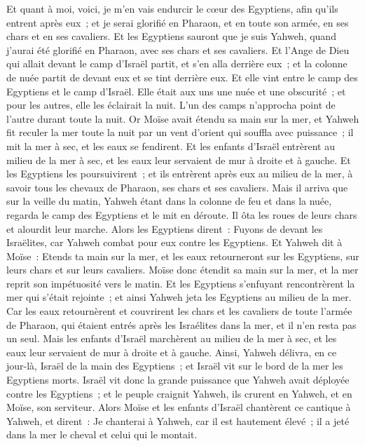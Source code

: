 \begin{multicols}{2}
 Et quant à moi, voici, je m'en vais endurcir le cœur des Egyptiens, afin qu'ils entrent après eux~; et je serai glorifié en Pharaon, et en toute son armée, en ses chars et en ses cavaliers.
Et les Egyptiens sauront que je suis Yahweh, quand j'aurai été glorifié en Pharaon, avec ses chars et ses cavaliers.
Et l'Ange de Dieu qui allait devant le camp d'Israël partit, et s'en alla derrière eux~; et la colonne de nuée partit de devant eux et se tint derrière eux.
Et elle vint entre le camp des Egyptiens et le camp d'Israël. Elle était aux uns une nuée et une obscurité~; et pour les autres, elle les éclairait la nuit. L'un des camps n'approcha point de l'autre durant toute la nuit.
Or Moïse avait étendu sa main sur la mer, et Yahweh fit reculer la mer toute la nuit par un vent d'orient qui souffla avec puissance~; il mit la mer à sec, et les eaux se fendirent.
Et les enfants d'Israël entrèrent au milieu de la mer à sec, et les eaux leur servaient de mur à droite et à gauche.
Et les Egyptiens les poursuivirent~; et ils entrèrent après eux au milieu de la mer, à savoir tous les chevaux de Pharaon, ses chars et ses cavaliers.
Mais il arriva que sur la veille du matin, Yahweh étant dans la colonne de feu et dans la nuée, regarda le camp des Egyptiens et le mit en déroute.
Il ôta les roues de leurs chars et alourdit leur marche. Alors les Egyptiens dirent~: Fuyons de devant les Israëlites, car Yahweh combat pour eux contre les Egyptiens.
Et Yahweh dit à Moïse~: Etends ta main sur la mer, et les eaux retourneront sur les Egyptiens, sur leurs chars et sur leurs cavaliers.
Moïse donc étendit sa main sur la mer, et la mer reprit son impétuosité vers le matin. Et les Egyptiens s'enfuyant rencontrèrent la mer qui s'était rejointe~; et ainsi Yahweh jeta les Egyptiens au milieu de la mer.
Car les eaux retournèrent et couvrirent les chars et les cavaliers de toute l'armée de Pharaon, qui étaient entrés après les Israélites dans la mer, et il n'en resta pas un seul.
Mais les enfants d'Israël marchèrent au milieu de la mer à sec, et les eaux leur servaient de mur à droite et à gauche.
Ainsi, Yahweh délivra, en ce jour-là, Israël de la main des Egyptiens~; et Israël vit sur le bord de la mer les Egyptiens morts.
Israël vit donc la grande puissance que Yahweh avait déployée contre les Egyptiens~; et le peuple craignit Yahweh, ils crurent en Yahweh, et en Moïse, son serviteur.
\VerseOne{}Alors Moïse et les enfants d'Israël chantèrent ce cantique à Yahweh, et dirent~: Je chanterai à Yahweh, car il est hautement élevé~; il a jeté dans la mer le cheval et celui qui le montait.

\end{multicols}
